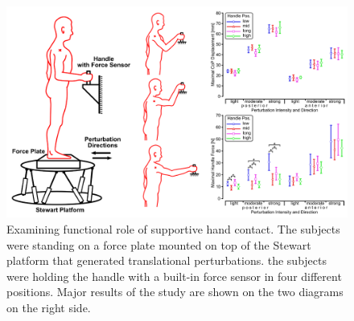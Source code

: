 \documentclass[final,5p,twocolumn]{elsarticle}
\begin{document}
\begin{figure}
\centering
\includegraphics[width=\linewidth]{images/exp1_JSI.png}
\caption{Examining functional role of supportive hand contact. The subjects were standing on a force plate mounted on top of the Stewart platform that generated translational perturbations. the subjects were holding the handle with a built-in force sensor in four different positions. Major results of the study are shown on the two diagrams on the right side.}
\label{fig:exp_paper_W2}
\end{figure}
\end{document}
